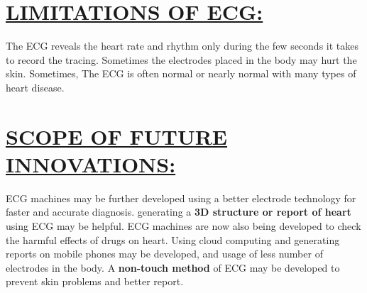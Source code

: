 \documentclass[12pt]{article}
\begin{document}
\section {\underline{LIMITATIONS OF ECG:}}
The ECG reveals the heart rate and rhythm only during the few seconds it takes to record the tracing.
Sometimes the electrodes placed in the body may hurt the skin.
Sometimes, The ECG is often normal or nearly normal with many types of heart disease.
\section{\underline{SCOPE OF FUTURE INNOVATIONS:}}
ECG machines may be further developed using a better electrode technology for faster and accurate diagnosis.
generating a \textbf{3D structure or report of heart} using ECG may be helpful.
ECG machines are now also being developed to check the harmful effects of drugs on heart.
Using cloud computing and generating reports on mobile phones may be developed, and usage of less number of electrodes in the body.
A \textbf{non-touch method} of ECG may be developed to prevent skin problems and better report.
\end{document}
